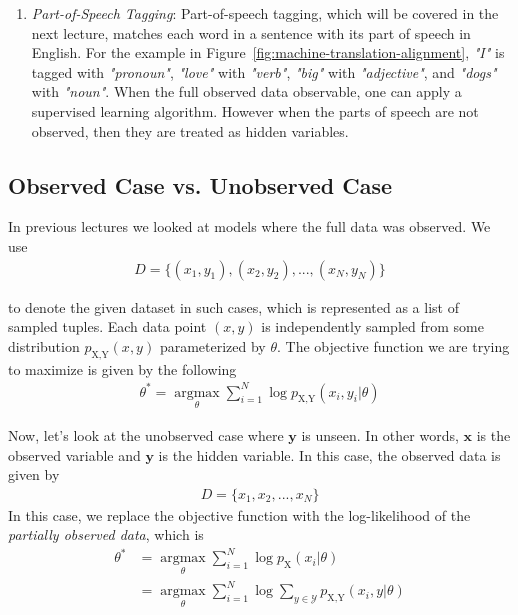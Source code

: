 \documentclass[justified, marginals=justified]{tufte-handout}
\theoremstyle{definition}
\begin{document}
\begin{enumerate}
	\item \textit{Part-of-Speech Tagging}: Part-of-speech tagging, which will be covered in the next lecture, matches each word in a sentence with its part of speech in English. For the example in Figure~\ref{fig:machine-translation-alignment}, \textit{"I"} is tagged with \textit{"pronoun"}, \textit{"love"} with \textit{"verb"}, \textit{"big"} with \textit{"adjective"}, and \textit{"dogs"} with \textit{"noun"}. When the full observed data observable, one can apply a supervised learning algorithm. However when the parts of speech are not observed, then they are treated as hidden variables. 
\end{enumerate}

\subsection{Observed Case vs. Unobserved Case}\label{sec:observed-case-vs-unobserved-case}

In previous lectures we looked at models where the full data was observed. We use 
\begin{align*}
D = \{(x_1, y_1), (x_2, y_2), ..., (x_N, y_N)\}
\end{align*}

\noindent to denote the given dataset in such cases, which is represented as a list of sampled tuples. Each data point $(x, y)$ is independently sampled from some distribution $p_{\text{X,Y}}(x,y)$ parameterized by $\theta$. The objective function we are trying to maximize is given by the following
\begin{align}
\label{eq:observed}\theta^{*} = \underset{\theta}{\operatorname{argmax}}\sum_{i=1}^{N}\log{p_{\text{X,Y}}(x_i, y_i|\theta) }
\end{align}

Now, let's look at the unobserved case where $\textbf{y}$ is unseen. In other words, $\textbf{x}$ is the observed variable and $\textbf{y}$ is the hidden variable. In this case, the observed data is given by
\begin{align*}
D = \{x_1, x_2, ..., x_N\}
\end{align*}
In this case, we replace the objective function with the log-likelihood of the \textit{partially observed data}, which is
\begin{align}
\theta^{*} &= \underset{\theta}{\operatorname{argmax}}\sum_{i=1}^{N}\log{p_{\text{X}}(x_i|\theta) } \nonumber \\
\label{eq:unobserved}&= \underset{\theta}{\operatorname{argmax}}\sum_{i=1}^{N}\log\sum_{y\in \mathcal{Y}}p_{\text{X,Y}}(x_i, y|\theta)
\end{align} 
\end{document}
